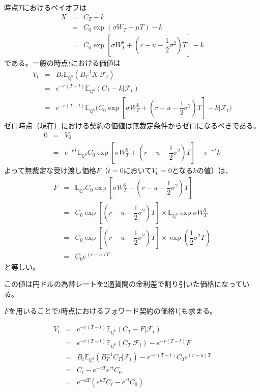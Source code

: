 \documentclass[uplatex,a4j,12pt,dvipdfmx]{jsarticle}
\begin{document}
時点$T$におけるペイオフは
%
%
\begin{eqnarray*}
	X
	&=&
	C_{T} - k
	\\ &=&
	C_{0} \exp (\sigma W_{T} + \mu T) - k
	\\ &=&
	C_{0}
	\exp
	\left[
		\sigma W^{\$}_{T}
		+
		\left(
		r - u -
		\dfrac{1}{2}
		\sigma^{2}
		\right) T
		\right]
	- k
\end{eqnarray*}
%
%
である。一般の時点$t$における価値は
%
%
\begin{eqnarray*}
	V_{t}
	&=&
	B_{t}
	\mathbb{E}_{\mathbb{Q}^{ \$ }}
	( B_{T}^{-1} X | \mathcal{F}_{t} )
	\\ &=&
	e^{-r(T-t)}
	\mathbb{E}_{\mathbb{Q}^{ \$ }}
	( C_{T} - k | \mathcal{F}_{t} )
	\\ &=&
	e^{-r(T-t)}
	\mathbb{E}_{\mathbb{Q}^{ \$ }}
	\Big(
	C_{0}
	\exp
	\left[
		\sigma W^{\$}_{T}
		+
		\left(
		r - u -
		\dfrac{1}{2}
		\sigma^{2}
		\right) T
		\right]
	- k
	\Big| \mathcal{F}_{t} \Big)
\end{eqnarray*}
%
%
ゼロ時点（現在）における契約の価値は無裁定条件からゼロになるべきである。
%
%
\begin{eqnarray*}
	0
	&=&
	V_{0}
	\\ &=&
	e^{-rT}
	\mathbb{E}_{\mathbb{Q}^{ \$ }}
	C_{0}
	\exp
	\left[
		\sigma W^{\$}_{T}
		+
		\left(
		r - u -
		\dfrac{1}{2}
		\sigma^{2}
		\right) T
		\right]
	- e^{-rT} k
\end{eqnarray*}
%
%
よって無裁定な受け渡し価格$F$（$t=0$において$V_{0}=0$となる$k$の値）は、
%
%
\begin{eqnarray*}
	F
	&=&
	\mathbb{E}_{\mathbb{Q}^{ \$ }}
	C_{0}
	\exp
	\left[
		\sigma W^{\$}_{T}
		+
		\left(
		r - u -
		\dfrac{1}{2}
		\sigma^{2}
		\right) T
		\right]
	\\ &=&
	C_{0}
	\exp
	\left[
		\left(
		r - u -
		\dfrac{1}{2}
		\sigma^{2}
		\right) T
		\right]
	\times
	\mathbb{E}_{\mathbb{Q}^{ \$ }}
	\exp
	\sigma W^{\$}_{T}
	\\ &=&
	C_{0}
	\exp
	\left[
		\left(
		r - u -
		\dfrac{1}{2}
		\sigma^{2}
		\right) T
		\right]
	\times
	\exp
	\left(
	\dfrac{1}{2}
	\sigma^{2} T
	\right)
	\\ &=&
	C_{0}
	e^{(r-u)T}
\end{eqnarray*}
%
%
と等しい。

この値は円ドルの為替レートを2通貨間の金利差で割り引いた価格になっている。

$F$を用いることで$t$時点におけるフォワード契約の価格$V_{t}$も求まる。

%
%
\begin{eqnarray*}
	V_{t}
	&=&
	e^{-r(T-t)}
	\mathbb{E}_{\mathbb{Q}^{ \$ }}
	(
	C_{T} - F
	| \mathcal{F}_{t} )
	\\ &=&
	e^{-r(T-t)}
	\mathbb{E}_{\mathbb{Q}^{ \$ }}
	(
	C_{T}
	| \mathcal{F}_{t} )
	- e^{-r(T-t)} F
	\\ &=&
	B_{t}
	\mathbb{E}_{\mathbb{Q}^{ \$ }}
	(B_{T}^{-1} C_{T} | \mathcal{F}_{t} )
	- e^{-r(T-t)} C_{0} e^{(r-u)T}
	\\ &=&
	C_{t} - e^{-uT} e^{rt} C_{0}
	\\ &=&
	e^{-uT}
	\left(
	e^{uT} C_{t}
	- e^{rt} C_{0}
	\right)
\end{eqnarray*}
%
%
\end{document}
